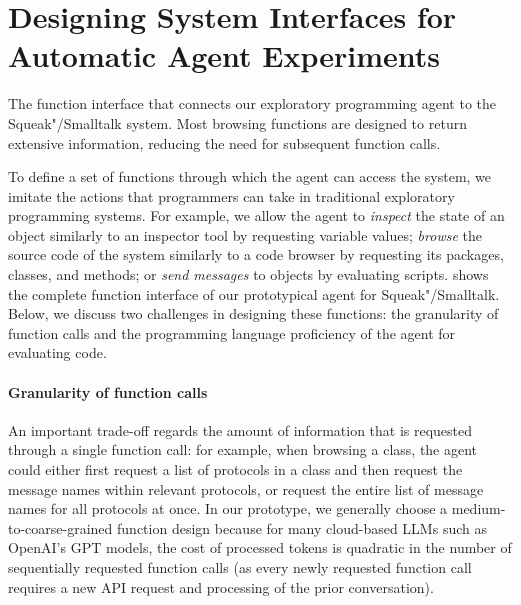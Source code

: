 
\section{Designing System Interfaces for Automatic Agent Experiments}
\label{sec:agent/interfaces}

\begin{table}
	\centering
	\footnotesize
	\caption[The function interface that connects our exploratory programming agent to the Squeak"/Smalltalk system.]{
		The function interface that connects our exploratory programming agent to the Squeak"/Smalltalk system.
		Most browsing functions are designed to return extensive information, reducing the need for subsequent function calls.
	}
	\label{tab:agent/functions/interface}
\end{table}

To define a set of functions through which the agent can access the system, we imitate the actions that programmers can take in traditional exploratory programming systems.
For example, we allow the agent to \emph{inspect} the state of an object similarly to an inspector tool by requesting variable values; \emph{browse} the source code of the system similarly to a code browser by requesting its packages, classes, and methods; or \emph{send messages} to objects by evaluating scripts.
 shows the complete function interface of our prototypical agent for Squeak"/Smalltalk.
Below, we discuss two challenges in designing these functions: the granularity of function calls and the programming language proficiency of the agent for evaluating code.

\paragraph{Granularity of function calls}
An important trade-off regards the amount of information that is requested through a single function call:
for example, when browsing a class, the agent could either first request a list of protocols in a class and then request the message names within relevant protocols, or request the entire list of message names for all protocols at once.
In our prototype, we generally choose a medium-to-coarse-grained function design because for many cloud-based LLMs such as OpenAI's GPT models, the cost of processed tokens is quadratic in the number of sequentially requested function calls (as every newly requested function call requires a new API request and processing of the prior conversation).

